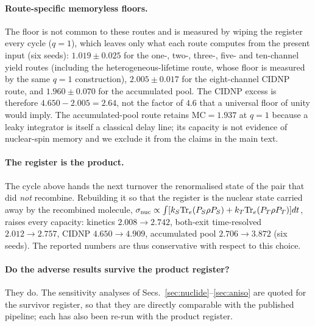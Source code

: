 \documentclass[aps,prx,reprint,superscriptaddress,nofootinbib,floatfix]{revtex4-2}
\begin{document}
\paragraph*{Route-specific memoryless floors.} The floor is not common to these
routes and is measured by wiping the register every cycle ($q=1$), which leaves
only what each route computes from the present input (six seeds):
$1.019\pm0.025$ for the one-, two-, three-, five- and ten-channel yield routes
(including the heterogeneous-lifetime route, whose floor is measured by the same
$q=1$ construction), $2.005\pm0.017$ for the eight-channel CIDNP route, and
$1.960\pm0.070$ for the accumulated pool. The CIDNP excess is therefore $4.650-2.005=2.64$, not the
factor of $4.6$ that a universal floor of unity would imply. The accumulated-pool
route retains $\mathrm{MC}=1.937$ at $q=1$ because a leaky integrator is itself a
classical delay line; its capacity is not evidence of nuclear-spin memory and we
exclude it from the claims in the main text.

\paragraph*{The register is the product.} The cycle above hands the next turnover
the renormalised state of the pair that did \emph{not} recombine. Rebuilding it so
that the register is the nuclear state carried away by the recombined molecule,
$\sigma_{\rm nuc}\propto\int[k_S\mathrm{Tr}_e(P_S\rho P_S)+k_T\mathrm{Tr}_e(P_T\rho P_T)]dt$,
raises every capacity: kinetics $2.008\to2.742$, both-exit time-resolved
$2.012\to2.757$, CIDNP $4.650\to4.909$, accumulated pool $2.706\to3.872$ (six
seeds). The reported numbers are thus conservative with respect to this choice.

\paragraph*{Do the adverse results survive the product register?} They do. The
sensitivity analyses of Secs.~\ref{sec:nuclide}--\ref{sec:aniso} are quoted for
the survivor register, so that they are directly comparable with the published
pipeline; each has also been re-run with the product register.
\end{document}
